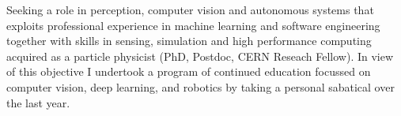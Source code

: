 

\begin{cvparagraph}


Seeking a role in perception, computer vision and autonomous systems that exploits 
professional experience in machine learning and software engineering together with  
skills in sensing, simulation and high performance computing acquired as a particle 
physicist (PhD, Postdoc, CERN Reseach Fellow). In view of this objective I 
undertook a program of continued education focussed on computer vision, 
deep learning, and robotics by taking a personal sabatical over the last year.

\end{cvparagraph}
